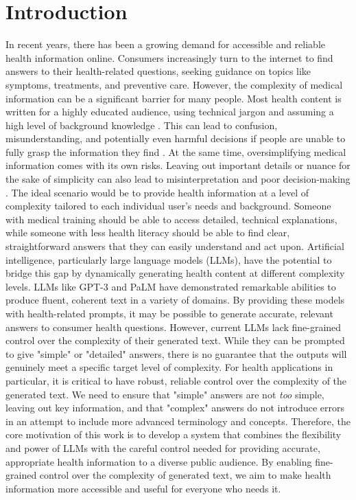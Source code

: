 \chapter{Introduction}
\label{c1}

In recent years, there has been a growing demand for accessible and reliable health information online.
Consumers increasingly turn to the internet to find answers to their health-related questions, seeking guidance on topics like symptoms, treatments, and preventive care.
However, the complexity of medical information can be a significant barrier for many people.
Most health content is written for a highly educated audience, using technical jargon and assuming a high level of background knowledge \cite{clarke2016readability,storm2020assessing}.
This can lead to confusion, misunderstanding, and potentially even harmful decisions if people are unable to fully grasp the information they find \cite{charow2019readability}.
At the same time, oversimplifying medical information comes with its own risks.
Leaving out important details or nuance for the sake of simplicity can also lead to misinterpretation and poor decision-making \cite{clark2011simplifying}.
The ideal scenario would be to provide health information at a level of complexity tailored to each individual user's needs and background.
Someone with medical training should be able to access detailed, technical explanations, while someone with less health literacy should be able to find clear, straightforward answers that they can easily understand and act upon.
Artificial intelligence, particularly large language models (LLMs), have the potential to bridge this gap by dynamically generating health content at different complexity levels.
LLMs like GPT-3 \cite{brown2020languagemodelsfewshotlearners} and PaLM \cite{chowdhery2022palm} have demonstrated remarkable abilities to produce fluent, coherent text in a variety of domains.
By providing these models with health-related prompts, it may be possible to generate accurate, relevant answers to consumer health questions.
However, current LLMs lack fine-grained control over the complexity of their generated text.
While they can be prompted to give "simple" or "detailed" answers, there is no guarantee that the outputs will genuinely meet a specific target level of complexity.
For health applications in particular, it is critical to have robust, reliable control over the complexity of the generated text.
We need to ensure that "simple" answers are not \textit{too} simple, leaving out key information, and that "complex" answers do not introduce errors in an attempt to include more advanced terminology and concepts.
Therefore, the core motivation of this work is to develop a system that combines the flexibility and power of LLMs with the careful control needed for providing accurate, appropriate health information to a diverse public audience.
By enabling fine-grained control over the complexity of generated text, we aim to make health information more accessible and useful for everyone who needs it.

